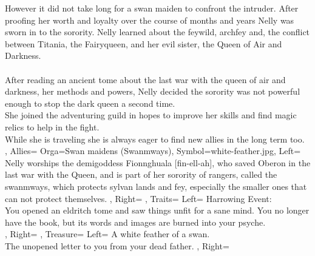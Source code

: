 \documentclass[10pt,a4paper]{scrbook}
\begin{document}
{{			However it did not take long for a swan maiden to confront the intruder.
			After proofing her worth and loyalty over the course of months and years Nelly was sworn in to the sorority.
			Nelly learned about the feywild, archfey and, the conflict between Titania, the Fairyqueen, and her evil sister, the Queen of Air and Darkness.\\
			\\
			After reading an ancient tome about the last war with the queen of air and darkness, her methods and powers, Nelly decided the sorority was not powerful enough to stop the dark queen a second time.\\
			She joined the adventuring guild in hopes to improve her skills and find magic relics to help in the fight.\\
			While she is traveling she is always eager to find new allies in the long term too.\\
		},
		Allies={
			Orga=Swan maidens (Swanmways),
			Symbol=white-feather.jpg,
			Left={
				Nelly worships the demigoddess Fionnghuala [fin-ell-ah], who saved Oberon in the last war with the Queen, and is part of her sorority of rangers, called the swanmways, which protects sylvan lands and fey, especially the smaller ones that can not protect themselves.
			},
			Right={
			}
		},
		Traits={
			Left={
				Harrowing Event:\\
				You opened an eldritch tome and saw things unfit for a sane mind. You no longer have the book, but its words and images are burned into your psyche.\\
			},
			Right={
			}
		},
		Treasure={
			Left={
				A white feather of a swan.\\
				The unopened letter to you from your dead father.
			},
			Right={
			}
		}
	}

\end{document}
